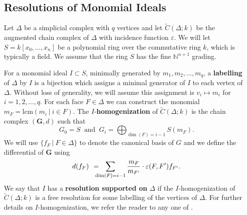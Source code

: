 \documentclass[12pt,leqno]{amsart}
\theoremstyle{definition}
\begin{document}
\subsection{Resolutions of Monomial Ideals}
\addtocounter{section}{1}
\label{S:Resolutions of Monomial Ideals}
%

%
Let $\Delta$ be a simplicial complex with $q$ vertices and let
$\widetilde C(\Delta;k)$ be the augmented chain complex of $\Delta$ with
incidence function $\varepsilon$. We will let $S = k[x_0,\dotsc,x_n]$ be a
polynomial ring over the commutative ring $k$, which is typically a field. We
assume that the ring $S$ has the fine $\mathbb N^{n+1}$ grading.

For a monomial ideal $I \subset S$, minimally generated by
$m_1,m_2,\dotsc,m_q$, a \textbf{labelling} of $\Delta$ by $I$ is a bijection
which assigns a minimal generator of $I$ to each vertex of $\Delta$. Without
loss of generality, we will assume this assignment is $v_i \longmapsto m_i$
for $i = 1,2,\dotsc,q$. For each face $F \in \Delta$ we can construct the
monomial $m_F = \mathrm{lcm}(m_i \ | \ i \in F )$. The
$I$-\textbf{homogenization} of $\widetilde{C} (\Delta;k)$ is the chain complex
$(\mathbf G, d)$ such that
%
\begin{displaymath}
  G_0 = S \ \text{ and } \ G_i = \bigoplus_{\dim(F) = i-1}S(m_F).
\end{displaymath}
%
We will use $\{f_F \ | \ F \in \Delta \}$ to denote the canonical basis of $G$ and we define the differential of $\mathbf G$ using
%
\begin{displaymath}
  d(f_F) \hspace{4pt} = \hspace{-8pt} \sum_{\dim(F) = i-1} \frac{m_F}{m_{F'}} \cdot \varepsilon(F,F') f_{F'}.
\end{displaymath}
%
We say that $I$ has a \textbf{resolution supported on} $\Delta$ if the
$I$-homogenization of $\widetilde C(\Delta; k)$ is a free resolution for some
labelling of the vertices of $\Delta$. For further details on
$I$-homogenization, we refer the reader to any one of \cite{BPS, MS, Peeva,
  PV}.
%
\end{document}
